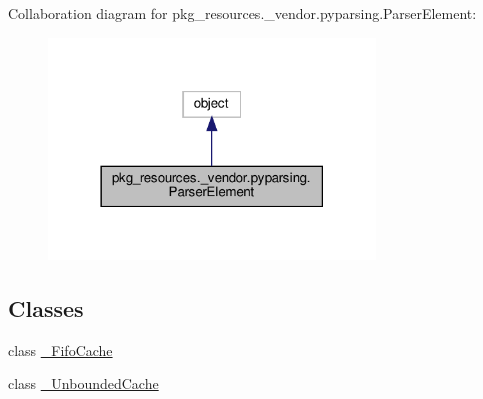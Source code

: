 Collaboration diagram for pkg\+\_\+resources.\+\_\+vendor.\+pyparsing.\+Parser\+Element\+:
\nopagebreak
\begin{figure}[H]
\begin{center}
\leavevmode
\includegraphics[width=246pt]{classpkg__resources_1_1__vendor_1_1pyparsing_1_1ParserElement__coll__graph}
\end{center}
\end{figure}
\subsection*{Classes}
\begin{DoxyCompactItemize}
\item 
class \hyperlink{classpkg__resources_1_1__vendor_1_1pyparsing_1_1ParserElement_1_1__FifoCache}{\+\_\+\+Fifo\+Cache}
\item 
class \hyperlink{classpkg__resources_1_1__vendor_1_1pyparsing_1_1ParserElement_1_1__UnboundedCache}{\+\_\+\+Unbounded\+Cache}
\end{DoxyCompactItemize}
